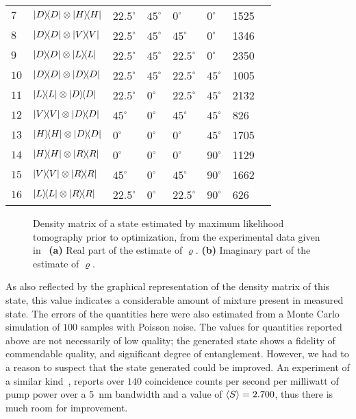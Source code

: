 \begin{table}[h]
\begin{tabular}{llllllll}
		$7$  & $\op{D}\otimes\op{H}$ & $22.5^{\circ}$ & $45^{\circ}$ & $0^{\circ}$     & $0^{\circ}$   & 1525 \\
		$8$  & $\op{D}\otimes\op{V}$ & $22.5^{\circ}$ & $45^{\circ}$ & $45^{\circ}$    & $0^{\circ}$   & 1346 \\
		$9$  & $\op{D}\otimes\op{L}$ & $22.5^{\circ}$ & $45^{\circ}$ & $22.5^{\circ}$  & $0^{\circ}$   & 2350 \\
		$10$ & $\op{D}\otimes\op{D}$ & $22.5^{\circ}$ & $45^{\circ}$ & $22.5^{\circ}$  & $45^{\circ}$  & 1005 \\
		$11$ & $\op{L}\otimes\op{D}$ & $22.5^{\circ}$ & $0^{\circ}$  & $22.5^{\circ}$  & $45^{\circ}$  & 2132 \\
		$12$ & $\op{V}\otimes\op{D}$ & $45^{\circ}$   & $0^{\circ}$  & $45^{\circ}$    & $45^{\circ}$  & 826 \\
		$13$ & $\op{H}\otimes\op{D}$ & $0^{\circ}$    & $0^{\circ}$  & $0^{\circ}$     & $45^{\circ}$  & 1705 \\
		$14$ & $\op{H}\otimes\op{R}$ & $0^{\circ}$    & $0^{\circ}$  & $0^{\circ}$     & $90^{\circ}$  & 1129 \\
		$15$ & $\op{V}\otimes\op{R}$ & $45^{\circ}$   & $0^{\circ}$  & $45^{\circ}$    & $90^{\circ}$  & 1662 \\
		$16$ & $\op{L}\otimes\op{R}$ & $22.5^{\circ}$ & $0^{\circ}$  & $22.5^{\circ}$  & $90^{\circ}$  & 626 \\
		\toprule
	\end{tabular}
\end{table}

\begin{figure}[h]
    \centering
	\caption[Density matrix of a state estimated by maximum likelihood tomography from experimental data prior to optimization.]{Density matrix of a state estimated by maximum likelihood tomography prior to optimization, from the experimental data given in~\protect{} \textbf{(a)} Real part of the estimate of $\varrho$. \textbf{(b)} Imaginary part of the estimate of $\varrho$.}
\end{figure}

\noindent
As also reflected by the graphical representation of the density matrix of this state, this value indicates a considerable amount of mixture present in measured state. The errors of the quantities here were also estimated from a Monte Carlo simulation of $100$ samples with Poisson noise. The values for quantities reported above are not necessarily of low quality; the generated state shows a fidelity of commendable quality, and significant degree of entanglement. However, we had to a reason to suspect that the state generated could be improved. An experiment of a similar kind~\cite{Kwiat_1999}, reports over $140$ coincidence counts per second per milliwatt of pump power over a \SI{5}{\nano\meter} bandwidth and a value of $\ev{S} = 2.700$, thus there is much room for improvement.

